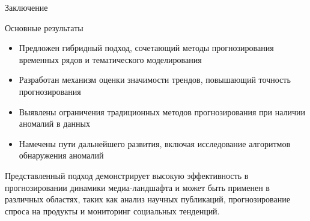 \documentclass{beamer}
\begin{document}
\begin{frame}{Заключение}
\begin{block}{Основные результаты}
\begin{itemize}
    \item Предложен гибридный подход, сочетающий методы прогнозирования временных рядов и тематического моделирования
    \item Разработан механизм оценки значимости трендов, повышающий точность прогнозирования
    \item Выявлены ограничения традиционных методов прогнозирования при наличии аномалий в данных
    \item Намечены пути дальнейшего развития, включая исследование алгоритмов обнаружения аномалий
\end{itemize}
\end{block}
Представленный подход демонстрирует высокую эффективность в прогнозировании динамики медиа-ландшафта и может быть применен в различных областях, таких как анализ научных публикаций, прогнозирование спроса на продукты и мониторинг социальных тенденций.
\end{frame}
\end{document}
